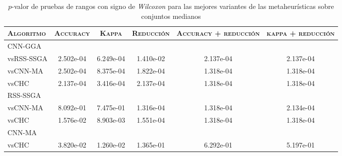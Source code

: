 \begin{table}[h!]
\centering
\begin{adjustbox}{max width =\textwidth}
\begin{tabular}{l c c c c c}
\hline
	\textsc{Algoritmo}
	& \multicolumn{1}{c}{\textsc{Accuracy}}
	& \multicolumn{1}{c}{\textsc{Kappa}}
	& \multicolumn{1}{c}{\textsc{Reducción}} 
	& \multicolumn{1}{c}{\textsc{Accuracy + reducción}} 
	& \multicolumn{1}{c}{\textsc{kappa + reducción}} \\

\hline
\hline

CNN-GGA\\
vsRSS-SSGA & 2.502e-04 & 6.249e-04 & 1.410e-02 & 2.137e-04 & 2.137e-04 \\ 
vsCNN-MA   & 2.502e-04 & 8.375e-04 & 1.822e-04 & 1.318e-04 & 1.318e-04 \\
vsCHC      & 2.137e-04 & 3.416e-04 & 2.137e-04 & 1.318e-04 & 1.318e-04 \\

\hline

RSS-SSGA\\
vsCNN-MA & 8.092e-01 & 7.475e-01 & 1.316e-04 & 1.318e-04 & 2.134e-04 \\
vsCHC    & 1.576e-02 & 8.903e-03 & 1.551e-04 & 1.318e-04 & 1.318e-04 \\

\hline

CNN-MA\\
vsCHC & 3.820e-02 & 1.260e-02 & 1.365e-01 & 6.292e-01 & 5.197e-01 \\

\hline

\end{tabular}
\end{adjustbox}
\caption[Pruebas de \emph{Wilcoxon} entre las mejores variaciones de cada metaheurística para conjuntos medianos]{$p$-valor de pruebas de rangos con signo de \emph{Wilcoxon} para las mejores variantes de las metaheurísticas sobre conjuntos medianos}
\label{wilcox-best-med}
\end{table}
